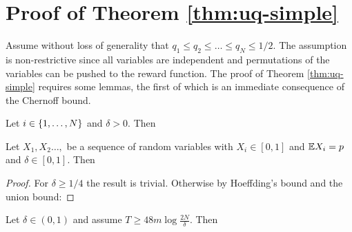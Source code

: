 

\section{Proof of Theorem \ref{thm:uq-simple}}\label{sec:thm:uq-simple}

Assume without loss of generality that $q_1 \leq q_2 \leq \ldots \leq q_N \leq 1/2$. The assumption is non-restrictive since all variables
are independent and permutations of the variables can be pushed to the reward function.
The proof of Theorem \ref{thm:uq-simple} requires some lemmas, the first of which is an immediate consequence of the Chernoff bound.


\begin{lemma}\label{lem:conc1}
Let $i \in \left\{1,\ldots, N\right\}$ and $\delta > 0$. Then
\end{lemma}

\begin{lemma}\label{lem:conc2}
Let $X_1,X_2\ldots,$ be a sequence of random variables with $X_i \in [0,1]$ and $\mathbb E X_i = p$ and $\delta \in [0,1]$.
Then 
\end{lemma}

\begin{proof}
For $\delta \geq 1/4$ the result is trivial. Otherwise 
by Hoeffding's bound and the union bound:
\end{proof}



\begin{lemma}\label{lem:m_est}
Let $\delta \in (0,1)$ and assume $T \geq 48m \log\frac{2N}{\delta}$. Then
\end{lemma}

